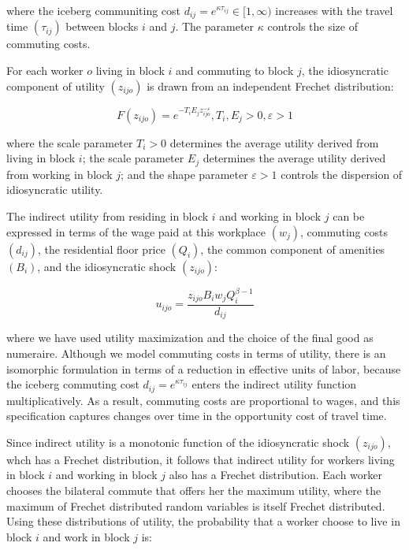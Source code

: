 where the iceberg communiting cost $d_{ij} = e^{\kappa \tau_{ij}} \in [1, \infty)$ increases with the travel time $(\tau_{ij})$ between blocks $i$ and $j$. The parameter $\kappa$ controls the size of commuting costs.

For each worker $o$ living in block $i$ and commuting to block $j$, the idiosyncratic component of utility $(z_{ijo})$ is drawn from an independent Frechet distribution:

\begin{equation}
    F(z_{ijo}) = e^{-T_i E_j z_{ijo}^{-\varepsilon}}, T_i, E_j > 0, \varepsilon > 1
\end{equation}

where the scale parameter $T_i > 0$ determines the average utility derived from living in block $i$; the scale parameter $E_j$ determines the average utility derived from working in block $j$; and the shape parameter $\varepsilon > 1$ controls the dispersion of idiosyncratic utility.

The indirect utility from residing in block $i$ and working in block $j$ can be expressed in terms of the wage paid at this workplace $(w_j)$, commuting costs $(d_{ij})$, the residential floor price $(Q_i)$, the common component of amenities $(B_i)$, and the idiosyncratic shock $(z_{ijo})$:

\begin{equation}
    u_{ijo} = \frac{z_{ijo} B_i w_j Q_i^{\beta - 1}}{d_{ij}}
\end{equation}

where we have used utility maximization and the choice of the final good as numeraire. Although we model commuting costs in terms of utility, there is an isomorphic formulation in terms of a reduction in effective units of labor, because the iceberg commuting cost $d_{ij} = e^{\kappa \tau_{ij}}$ enters the indirect utility function multiplicatively. As a result, commuting costs are proportional to wages, and this specification captures changes over time in the opportunity cost of travel time.

Since indirect utility is a monotonic function of the idiosyncratic shock $(z_{ijo})$, whch has a Frechet distribution, it follows that indirect utility for workers living in block $i$ and working in block $j$ also has a Frechet distribution. Each worker chooses the bilateral commute that offers her the maximum utility, where the maximum of Frechet distributed random variables is itself Frechet distributed. Using these distributions of utility, the probability that a worker choose to  live in block $i$ and work in block $j$ is:

